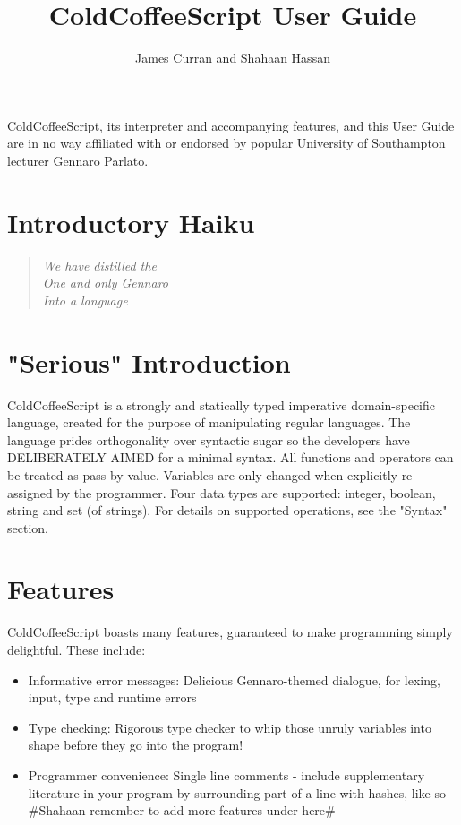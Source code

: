\documentclass{article}
\author{James Curran and Shahaan Hassan}
\title{ColdCoffeeScript User Guide}
\begin{document}
\maketitle
ColdCoffeeScript, its interpreter and accompanying features, and this User Guide are in no way affiliated with or endorsed by popular University of Southampton lecturer Gennaro Parlato.  

\section{Introductory Haiku}

\begin{quote}
\textit{We have distilled the\\One and only Gennaro\\Into a language}
\end{quote}

\section{"Serious" Introduction}
ColdCoffeeScript is a strongly and statically typed imperative domain-specific language, created for the purpose of manipulating regular languages. The language prides orthogonality over syntactic sugar so the developers have DELIBERATELY AIMED for a minimal syntax. All functions and operators can be treated as pass-by-value. Variables are only changed when explicitly re-assigned by the programmer. Four data types are supported: integer, boolean, string and set (of strings). For details on supported operations, see the "Syntax" section.

\section{Features}
ColdCoffeeScript boasts many features, guaranteed to make programming simply delightful. These include:
\begin{itemize}
\item Informative error messages: Delicious Gennaro-themed dialogue, for lexing, input, type and runtime errors
\item Type checking: Rigorous type checker to whip those unruly variables into shape before they go into the program!
\item Programmer convenience: Single line comments - include supplementary literature in your program by surrounding part of a line with hashes, like so \#Shahaan remember to add more features under here\#
\end{itemize}
\end{document}
